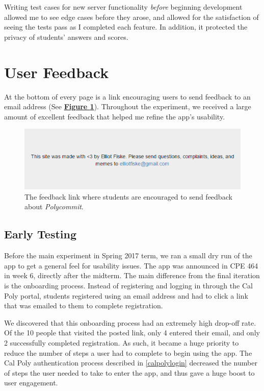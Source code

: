 \par Writing test cases for new server functionality \textit{before} beginning development allowed me to see edge cases before they arose, and allowed for the satisfaction of seeing the tests pass as I completed each feature. In addition, it protected the privacy of students' answers and scores.



\section{User Feedback}
\par At the bottom of every page is a link encouraging users to send feedback to an email address (See \textbf{\hyperref[fig:feedbacklink]{Figure \ref*{fig:feedbacklink}}}). Throughout the experiment, we received a large amount of excellent feedback that helped me refine the app's usability.

\begin{figure}
	\includegraphics[width=1.1\linewidth]{figures/feedbacklink}
	\caption{The feedback link where students are encouraged to send feedback about \textit{Polycommit}.}
	\label{fig:feedbacklink}
\end{figure}

\subsection{Early Testing}
\par Before the main experiment in Spring 2017 term, we ran a small dry run of the app to get a general feel for usability issues. The app was announced in CPE 464 in week 6, directly after the midterm. The main difference from the final iteration is the onboarding process. Instead of registering and logging in through the Cal Poly portal, students registered using an email address and had to click a link that was emailed to them to complete registration.

\par We discovered that this onboarding process had an extremely high drop-off rate. Of the 10 people that visited the posted link, only 4 entered their email, and only 2 successfully completed registration. As such, it became a huge priority to reduce the number of steps a user had to complete to begin using the app. The Cal Poly authentication process described in \ref{calpolylogin} decreased the number of steps the user needed to take to enter the app, and thus gave a huge boost to user engagement.

